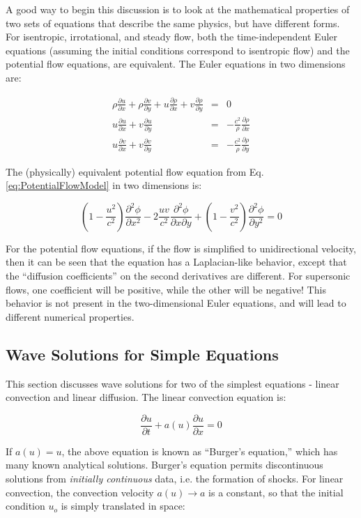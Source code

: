 \documentclass[10pt]{article}
\newcommand{\beq}{\begin{equation}}
\newcommand{\eeq}{\end{equation}}
\begin{document}
\begin{flushleft}
A good way to begin this discussion is to look at the mathematical properties of two sets of equations that describe the same physics, but have different forms. For isentropic, irrotational, and steady flow, both the time-independent Euler equations (assuming the initial conditions correspond to isentropic flow) and the potential flow equations, are equivalent. The Euler equations in two dimensions are:

\begin{subequations}
\label{eq:2DEuler}
\begin{eqnarray}
\rho\frac{\partial u}{\partial x}+\rho\frac{\partial v}{\partial y}+u\frac{\partial\rho}{\partial x}+v\frac{\partial\rho}{\partial y}&=&0\\
u\frac{\partial u}{\partial x}+v\frac{\partial u}{\partial y}&=&-\frac{c^2}{\rho}\frac{\partial\rho}{\partial x}\\
u\frac{\partial v}{\partial x}+v\frac{\partial v}{\partial y}&=&-\frac{c^2}{\rho}\frac{\partial\rho}{\partial y}
\end{eqnarray}
\end{subequations}

The (physically) equivalent potential flow equation from Eq. \eqref{eq:PotentialFlowModel} in two dimensions is:

\beq
\left(1-\frac{u^2}{c^2}\right)\frac{\partial^2\phi}{\partial x^2}-2\frac{uv}{c^2}\frac{\partial^2\phi}{\partial x\partial y}+\left(1-\frac{v^2}{c^2}\right)\frac{\partial^2\phi}{\partial y^2}=0
\eeq

For the potential flow equations, if the flow is simplified to unidirectional velocity, then it can be seen that the equation has a Laplacian-like behavior, except that the ``diffusion coefficients'' on the second derivatives are different. For supersonic flows, one coefficient will be positive, while the other will be negative! This behavior is not present in the two-dimensional Euler equations, and will lead to different numerical properties.

\subsection{Wave Solutions for Simple Equations}
This section discusses wave solutions for two of the simplest equations - linear convection and linear diffusion. The linear convection equation is:

\beq
\frac{\partial u}{\partial t}+a(u)\frac{\partial u}{\partial x}=0
\eeq

If \(a(u)=u\), the above equation is known as ``Burger's equation,'' which has many known analytical solutions. Burger's equation permits discontinuous solutions from {\it initially continuous} data, i.e. the formation of shocks. For linear convection, the convection velocity \(a(u)\rightarrow a\) is a constant, so that the initial condition \(u_o\) is simply translated in space:


\end{flushleft}
\end{document}
